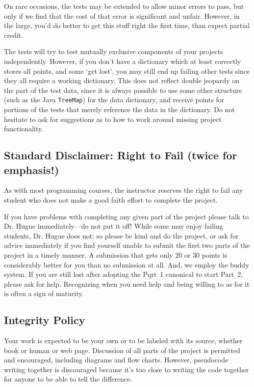 \documentclass[12pt]{article}
\begin{document}
On rare occasions,  the tests may be extended to allow minor errors to
 pass, but only  if we find  that the  cost of that error is
 significant and unfair. However, in   the large, you'd do better to
 get this stuff right the first time, than expect partial credit.



The tests will try to test mutually exclusive components of your
projects independently.  However, if you don't have a dictionary which
at least correctly stores all points, and some `get lost', you may
still end up failing other tests since they all require a working
dictionary.  This does not reflect double jeopardy on the part of the
test data, since it is always possible to use some other structure
(such as the Java \texttt{TreeMap}) for the data dictionary, and
receive points for portions of the tests that merely reference the
data in the dictionary. Do not hesitate to ask   for suggestions as to
how to work around missing project functionality.

\subsection{Standard Disclaimer: Right to Fail (twice for emphasis!)}

As with most programming courses, the instructor reserves the right to
fail any student who does not make a good faith effort to complete the
project.

If you have problems with completing any given part of the project
please talk to Dr. Hugue immediately---do not put it off!  While some
may enjoy failing students, Dr. Hugue does not; so please be kind and
do the project, or ask for advice immediately if you find yourself
unable to submit the first two parts of the project in a timely
manner.  A submission that gets only 20 or 30 points is considerably
better for you than no submission at all.  And, we employ  the buddy
system. If you are still lost after adopting the Pqrt~1 canonical to start Part~2, please ask for
help. Recognizing when you need help and being willing to as for it
is often a sign of maturity.


\subsection{Integrity Policy}

Your work is expected to be your own or to be labeled with its source,
whether book or human or web page.  Discussion of all parts of the
project is permitted and encouraged, including diagrams and flow
charts.  However, pseudocode writing together is discouraged because
it's too close to writing the code together for anyone to be able to
tell the difference.
\end{document}
